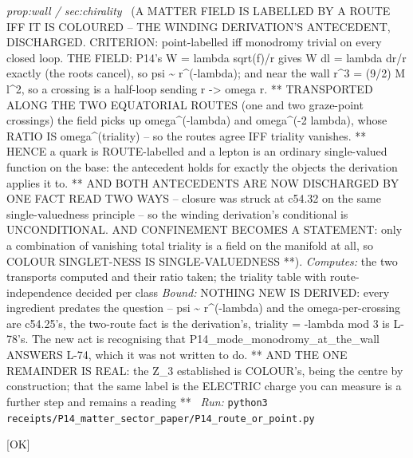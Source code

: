 \begin{description}
\textit{prop:wall / sec:chirality} \ (A MATTER FIELD IS LABELLED BY A ROUTE IFF IT IS COLOURED -- THE WINDING DERIVATION'S ANTECEDENT, DISCHARGED. CRITERION: point-labelled iff monodromy trivial on every closed loop. THE FIELD: P14's W = lambda sqrt(f)/r gives W dl = lambda dr/r exactly (the roots cancel), so psi \textasciitilde{} r\textasciicircum{}(-lambda); and near the wall r\textasciicircum{}3 = (9/2) M l\textasciicircum{}2, so a crossing is a half-loop sending r -> omega r. ** TRANSPORTED ALONG THE TWO EQUATORIAL ROUTES (one and two graze-point crossings) the field picks up omega\textasciicircum{}(-lambda) and omega\textasciicircum{}(-2 lambda), whose RATIO IS omega\textasciicircum{}(triality) -- so the routes agree IFF triality vanishes. ** HENCE a quark is ROUTE-labelled and a lepton is an ordinary single-valued function on the base: the antecedent holds for exactly the objects the derivation applies it to. ** AND BOTH ANTECEDENTS ARE NOW DISCHARGED BY ONE FACT READ TWO WAYS -- closure was struck at c54.32 on the same single-valuedness principle -- so the winding derivation's conditional is UNCONDITIONAL. AND CONFINEMENT BECOMES A STATEMENT: only a combination of vanishing total triality is a field on the manifold at all, so COLOUR SINGLET-NESS IS SINGLE-VALUEDNESS **). 
\emph{Computes:} the two transports computed and their ratio taken; the triality table with route-independence decided per class
 \emph{Bound:} NOTHING NEW IS DERIVED: every ingredient predates the question -- psi \textasciitilde{} r\textasciicircum{}(-lambda) and the omega-per-crossing are c54.25's, the two-route fact is the derivation's, triality = -lambda mod 3 is L-78's. The new act is recognising that P14\_mode\_monodromy\_at\_the\_wall ANSWERS L-74, which it was not written to do. ** AND THE ONE REMAINDER IS REAL: the Z\_3 established is COLOUR's, being the centre by construction; that the same label is the ELECTRIC charge you can measure is a further step and remains a reading **
\ \emph{Run:} \texttt{python3 receipts/P14\_matter\_sector\_paper/P14\_route\_or\_point.py}
\item[\rcptlabel{P14_the_bundle_is_the_branching}{P14R26}\textbf{P14R26}\quad\texttt{P14\_the\_bundle\_is\_the\_branching}]\hfill\textsf{[OK]}\\

\end{description}
